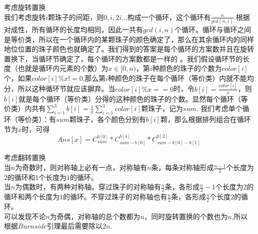 考虑旋转置换 \\

我们考虑旋转$i$颗珠子的间距，则$0,i,2i...$构成一个循环，这个循环有$\frac{n}{gcd(n,i)}$.根据对成性，所有循环的长度均相同，因此一共有$gcd(i,n)$个循环。循环与循环之间是等价类，所以在一个循环内的某颗珠子的颜色确定了，那么在其余循环内的同样地位位置的珠子颜色也就确定了。我们得到的答案是每个循环的方案数并且在旋转置换下，当循环节确定了，每个循环的方案数都是一样的 。我们假设循环节的长度（也就是循环内元素的个数）为$x\in [0,n)$，第$i$种颜色的珠子的个数为$color[i]$个，如果$color[i] \% x !=0$,那么第$i$种颜色的珠子在每个循环（等价类）内就不能均分，所以这种循环节就应该摒弃。当$color[i] \% x ==0$时，令$b[i] = \frac{color[i]}{x}$，则$b[i]$就是每个循环（等价类）分得的这种颜色的珠子的个数。显然每个循环（等价类）内共有$\sum_{i=1}^{3}b[i]=\frac{1}{x}\sum_{i=1}^{3}color[i]$颗珠子，记为$sum$. 我们考虑单个循环（等价类）：有$sum$颗珠子，各个颜色分别有$b[i]$颗，那么根据排列组合在循环节为$x$时，可得$$Ans[x]=C_{sum}^{b[0]}*C_{sum-b[0]}^{b[1]}*C_{sum-b[0]-b[1]}^{b[2]}$$

考虑翻转置换 \\

当$n$为奇数时，则对称轴上必有一点，对称轴有$n$条，每条对称轴形成$\frac{n-1}{2}$个长度为$2$的循环和$1$个长度为$1$的循环。\\

当$n$为偶数时，有两种对称轴。穿过珠子的对称轴有$\frac{n}{2}$条，各形成$\frac{n}{2}-1$个长度为2的循环和两个长度为$1$的循环。不穿过珠子的对称轴也有$\frac{n}{2}$条，各形成$\frac{n}{2}$个长度$2$的循环。\\

可以发现不论$n$为奇偶，对称轴的总个数都为$n$，同时旋转置换的个数也为$n$,所以根据$Burnside$引理最后需要除以$2n$.

